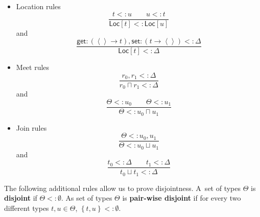 \documentclass[12pt]{article}
\begin{document}
\begin{itemize}
\item Location rules%
\begin{equation*}
\frac{t<:u\qquad u<:t}{\mathsf{Loc}[t]<:\mathsf{Loc}[u]}
\end{equation*}%
and%
\begin{equation*}
\frac{\mathsf{get}\colon \left( \left\langle {}\right\rangle \rightarrow
t\right) ,\mathsf{set}\colon \left( t\rightarrow \left\langle
{}\right\rangle \right) <:\Delta }{\mathsf{Loc}[t]<:\Delta }
\end{equation*}

\item Meet rules%
\begin{equation*}
\frac{r_{0},r_{1}<:\Delta }{r_{0}\sqcap r_{1}<:\Delta }
\end{equation*}%
and%
\begin{equation*}
\frac{\Theta <:u_{0}\qquad \Theta <:u_{1}}{\Theta <:u_{0}\sqcap u_{1}}
\end{equation*}

\item Join rules%
\begin{equation*}
\frac{\Theta <:u_{0},u_{1}}{\Theta <:u_{0}\sqcup u_{1}}
\end{equation*}%
and%
\begin{equation*}
\frac{t_{0}<:\Delta \qquad t_{1}<:\Delta }{t_{0}\sqcup t_{1}<:\Delta }
\end{equation*}
\end{itemize}

The following additional rules allow us to prove disjointness. A\ set of
types $\Theta $ is \textbf{disjoint} if $\Theta <:\emptyset $. As set of
types $\Theta $ is \textbf{pair-wise disjoint} if for every two different
types $t,u\in \Theta $, $\left\{ t,u\right\} <:\emptyset $.
\end{document}

